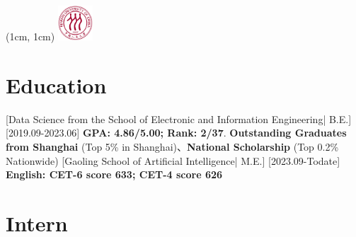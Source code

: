 \documentclass{resume}
\begin{document}
\begin{textblock*}{2cm}(1cm, 1cm)
  {\includegraphics[height=1.3cm]{figure/ruc_uni_logo.png}}
\end{textblock*}


\ResumeTitle


\section{Education}
[\textnormal{Data Science from the School of Electronic and Information Engineering|} B.E.]
[2019.09-2023.06]
\textbf{GPA: 4.86/5.00; Rank: 2/37}. \textbf{Outstanding Graduates from Shanghai} (Top 5\% in Shanghai)、\textbf{National Scholarship} (Top 0.2\% Nationwide)
[\textnormal{Gaoling School of Artificial Intelligence|} M.E.]
[2023.09-Todate]
\textbf{English: CET-6 score 633; CET-4 score 626}

\section{Intern}
\end{document}
